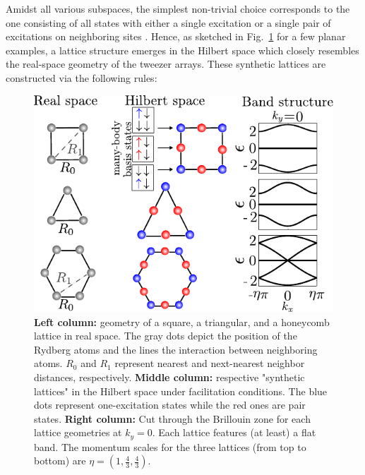 \documentclass[prl,aps,twocolumn,showpacs,superscriptaddress,longbibliography]{revtex4-1}
\begin{document}
Amidst all various subspaces, the simplest non-trivial choice corresponds to the one consisting of all states with either a single excitation or a single pair of excitations on neighboring sites \cite{Mattioli2015, a_Marcuzzi_PRL_17}. Hence, as sketched in Fig.~\ref{Fig:flat_band_lattices} for a few planar examples, a lattice structure emerges in the Hilbert space which closely resembles the real-space geometry of the tweezer arrays. These synthetic lattices are constructed via the following rules:
\begin{figure}
\includegraphics[width=\columnwidth]{Figure1.pdf}
\caption{\textbf{Left column:} geometry of a square, a triangular, and a honeycomb lattice in real space. The gray dots depict the position of the Rydberg atoms and the lines the interaction between neighboring atoms. $R_0$ and $R_1$ represent nearest and next-nearest neighbor distances, respectively. \textbf{Middle column:} respective "synthetic lattices" in the Hilbert space under facilitation conditions. The blue dots represent one-excitation states while the red ones are pair states. \textbf{Right column:} Cut through the Brillouin zone for each lattice geometries at $k_y= 0$. Each lattice features (at least) a flat band. The momentum scales for the three lattices (from top to bottom) are $\eta=(1,\tfrac{4}{3},\tfrac{4}{3}).$}
\label{Fig:flat_band_lattices}
\end{figure}
\end{document}
